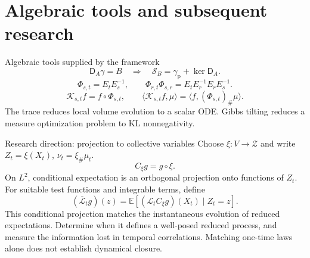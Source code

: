 \section[Research directions]{Algebraic tools and subsequent research}

\begin{frame}[t]{Algebraic tools supplied by the framework}
\hypertarget{main:tools}{}
\begin{equation*}
  \mathsf D_A\gamma=B\quad\Longrightarrow\quad
  \mathcal S_B=\gamma_{\mathrm p}+\ker\mathsf D_A.
\end{equation*}
\begin{equation*}
  \Phi_{s,t}=E_tE_s^{-1},\qquad
  \Phi_{r,t}\Phi_{s,r}=E_tE_r^{-1}E_rE_s^{-1}.
\end{equation*}
\begin{equation*}
  \mathcal K_{s,t}f=f\circ\Phi_{s,t},\qquad
  \langle\mathcal K_{s,t}f,\mu\rangle=\langle f,(\Phi_{s,t})_\#\mu\rangle.
\end{equation*}
The trace reduces local volume evolution to a scalar ODE.
Gibbs tilting reduces a measure optimization problem to KL nonnegativity.
\end{frame}

\begin{frame}[t]{Research direction: projection to collective variables}
\hypertarget{main:research-projection}{}
Choose $\xi:V\to\mathcal Z$ and write $Z_t=\xi(X_t)$, $\nu_t=\xi_\#\mu_t$.
\begin{equation*}
  C_\xi g=g\circ\xi.
\end{equation*}
On $L^2$, conditional expectation is an orthogonal projection onto functions of $Z_t$.
For suitable test functions and integrable terms, define
\begin{equation*}
  (\overline{\mathcal L}_t g)(z)
  =\mathbb E[(\mathcal L_t C_\xi g)(X_t)\mid Z_t=z].
\end{equation*}
This conditional projection matches the instantaneous evolution of reduced expectations.
Determine when it defines a well-posed reduced process, and measure the information
lost in temporal correlations. Matching one-time laws alone does not establish dynamical closure.
\end{frame}

